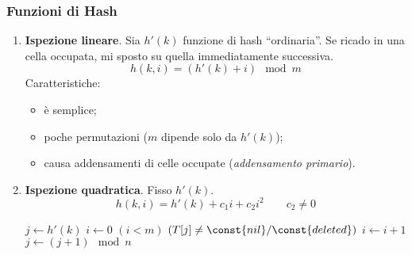 \subsubsection{Funzioni di Hash}
\begin{enumerate}
    \item \textbf{Ispezione lineare}. Sia $h'(k)$ funzione di hash ``ordinaria''. Se 
        ricado in una cella occupata, mi sposto su quella immediatamente successiva.
        $$h(k,i) = (h'(k)+i) \mod m$$
        Caratteristiche:
        \begin{itemize}
            \item è semplice;
            \item poche permutazioni ($m$ dipende solo da $h'(k)$);
            \item causa addensamenti di celle occupate (\emph{addensamento primario}).
        \end{itemize}
    \item \textbf{Ispezione quadratica}. Fisso $h'(k)$.
    $$h(k,i) = h'(k) + c_1i + c_2i^2 \qquad c_2 \neq 0$$

    \begin{codebox}
        \zi $j \gets h'(k)$
        \zi $i \gets 0$
        \zi \While $(i < m)$  $(T[j] \neq \const{nil}/\const{deleted})$
        \zi \Do
                $i \gets i + 1$
        \zi     $j \gets (j + 1) \mod n$
            \End
    \end{codebox}


\end{enumerate}
